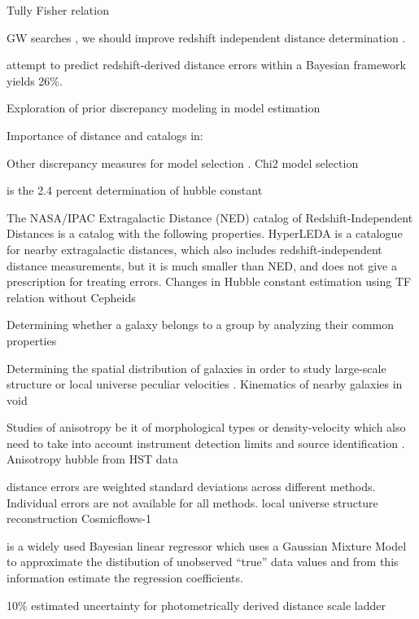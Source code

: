 \documentclass[a4paper,fleqn,usenatbib]{mnras}
\begin{document}
Tully Fisher relation \citet{precisetf}

GW searches \citet{gwgallist}, we should improve redshift independent distance determination .

\citet{6df} attempt to predict redshift-derived distance errors within a Bayesian framework yields 26\%.

Exploration of prior discrepancy modeling in model estimation \citet{priordisc}

Importance of distance and catalogs \citet{catetg,catspi} in:

Other discrepancy measures for model selection \citet{otherdisc}. Chi2 model selection \citet{chi2ms}

\citet{riess} is the 2.4 percent determination of hubble constant

The NASA/IPAC Extragalactic Distance (NED) catalog of Redshift-Independent Distances \citet{ned07,ned} is  a catalog with the following properties. HyperLEDA \citet{hyperleda} is a catalogue for nearby extragalactic distances, which also includes redshift-independent distance measurements, but it is much smaller than NED, and does not give a prescription for treating errors. Changes in Hubble constant estimation using TF relation without Cepheids \citet{noceph}

Determining whether a galaxy belongs to a group by analyzing their common properties \citet{gg3500} 

Determining the spatial distribution of galaxies in order to study large-scale structure \citet{gallargescale} or local universe peculiar velocities \citet{localunipv}. Kinematics of nearby galaxies in void \citet{void}

Studies of anisotropy be it of morphological types \citet{morphanis} or density-velocity \citet{nongauss} which also need to take into account instrument detection limits \citet{catmatch} and source identification \citet{baymatch}. Anisotropy hubble from HST data \citet{anishub}

\citet{cosmicflows} distance errors are weighted standard deviations across different methods. Individual errors are not available for all methods. \citet{locunivcf} local universe structure reconstruction Cosmicflows-1

\citet{gmastro} is a widely used Bayesian linear regressor which uses a Gaussian Mixture Model to approximate the distibution of unobserved ``true'' data values and from this information estimate the regression coefficients.

10\% estimated uncertainty for photometrically derived distance scale ladder \citet{hubunc}
\end{document}
